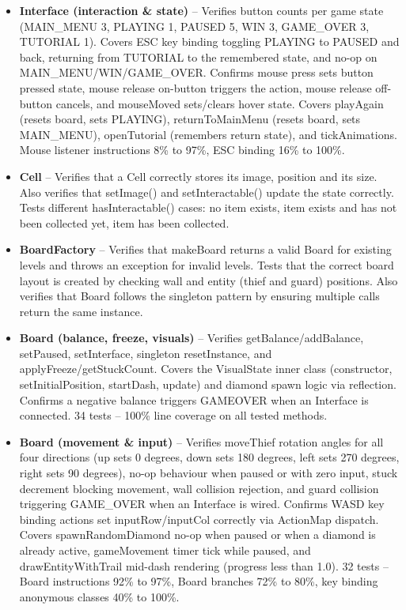 \documentclass[12pt]{article}
\begin{document}
\begin{itemize}
\item \textbf{Interface (interaction \& state)} -- Verifies button counts per game state (MAIN\_MENU 3, PLAYING 1, PAUSED 5, WIN 3, GAME\_OVER 3, TUTORIAL 1). Covers ESC key binding toggling PLAYING to PAUSED and back, returning from TUTORIAL to the remembered state, and no-op on MAIN\_MENU/WIN/GAME\_OVER. Confirms mouse press sets button pressed state, mouse release on-button triggers the action, mouse release off-button cancels, and mouseMoved sets/clears hover state. Covers playAgain (resets board, sets PLAYING), returnToMainMenu (resets board, sets MAIN\_MENU), openTutorial (remembers return state), and tickAnimations. Mouse listener instructions 8\% to 97\%, ESC binding 16\% to 100\%.

\item \textbf{Cell} -- Verifies that a Cell correctly stores its image, position and its size. Also verifies that setImage() and setInteractable() update the state correctly. Tests different hasInteractable() cases: no item exists, item exists and has not been collected yet, item has been collected.

\item \textbf{BoardFactory} -- Verifies that makeBoard returns a valid Board for existing levels and throws an exception for invalid levels. Tests that the correct board layout is created by checking wall and entity (thief and guard) positions. Also verifies that Board follows the singleton pattern by ensuring multiple calls return the same instance.

\item \textbf{Board (balance, freeze, visuals)} -- Verifies getBalance/addBalance, setPaused, setInterface, singleton resetInstance, and applyFreeze/getStuckCount. Covers the VisualState inner class (constructor, setInitialPosition, startDash, update) and diamond spawn logic via reflection. Confirms a negative balance triggers GAMEOVER when an Interface is connected. 34 tests -- 100\% line coverage on all tested methods.

\item \textbf{Board (movement \& input)} -- Verifies moveThief rotation angles for all four directions (up sets 0 degrees, down sets 180 degrees, left sets 270 degrees, right sets 90 degrees), no-op behaviour when paused or with zero input, stuck decrement blocking movement, wall collision rejection, and guard collision triggering GAME\_OVER when an Interface is wired. Confirms WASD key binding actions set inputRow/inputCol correctly via ActionMap dispatch. Covers spawnRandomDiamond no-op when paused or when a diamond is already active, gameMovement timer tick while paused, and drawEntityWithTrail mid-dash rendering (progress less than 1.0). 32 tests -- Board instructions 92\% to 97\%, Board branches 72\% to 80\%, key binding anonymous classes 40\% to 100\%.


\end{itemize}
\end{document}
